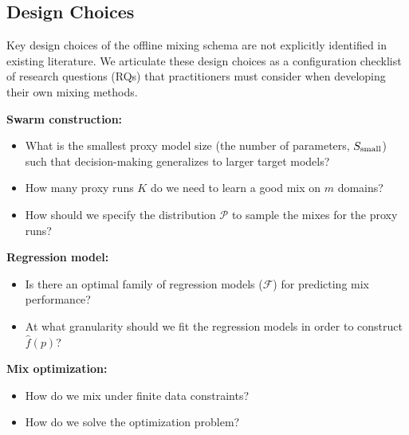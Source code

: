 \subsection{\olmix Design Choices}\label{sec:design_choices}

Key design choices of the offline mixing schema are not explicitly identified in existing literature. We articulate these design choices as a configuration checklist of research questions (RQs) that practitioners must consider when developing their own mixing methods.

\begin{tcolorbox}[colback=ai2offwhite,colframe=black,boxrule=0.5pt,arc=3pt,left=6pt,right=6pt,top=6pt,bottom=6pt]
\textbf{Swarm construction:}
\begin{itemize}[itemsep=0.00pt,topsep=0pt,leftmargin=30pt]
    \item[\emph{RQ1}] What is the smallest proxy model size (the number of parameters, $S_{\text{small}}$) such that decision-making generalizes to larger target models?
    \item[\emph{RQ2}] How many proxy runs $K$ do we need to learn a good mix on $m$ domains?
    \item[\emph{RQ3}] How should we specify the distribution $\mathcal{P}$ to sample the mixes for the proxy runs?
\end{itemize}

\textbf{Regression model:}
\begin{itemize}[itemsep=0.00pt,topsep=0pt,leftmargin=30pt]
    \item[\emph{RQ4}] Is there an optimal family of regression models ($\mathcal{F}$) for predicting mix performance?
    \item[\emph{RQ5}] At what granularity should we fit the regression models in order to construct $\hat{f}(p)$?
\end{itemize}

\textbf{Mix optimization:}
\begin{itemize}[itemsep=0.00pt,topsep=0pt,leftmargin=30pt]
    \item[\emph{RQ6}] How do we mix under finite data constraints?
    \item[\emph{RQ7}] How do we solve the optimization problem?
\end{itemize}
\end{tcolorbox}



